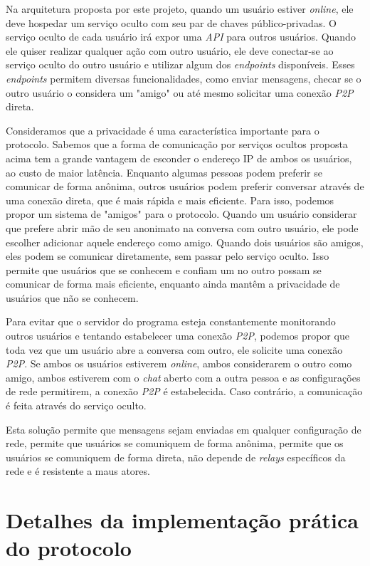 Na arquitetura proposta por este projeto, quando um usuário estiver \textit{online}, ele deve hospedar um serviço oculto com seu par de chaves público-privadas. O serviço oculto de cada usuário irá expor uma \textit{API} para outros usuários. Quando ele quiser realizar qualquer ação com outro usuário, ele deve conectar-se ao serviço oculto do outro usuário e utilizar algum dos \textit{endpoints} disponíveis. Esses \textit{endpoints} permitem diversas funcionalidades, como enviar mensagens, checar se o outro usuário o considera um "amigo" ou até mesmo solicitar uma conexão \textit{P2P} direta.

Consideramos que a privacidade é uma característica importante para o protocolo. Sabemos que a forma de comunicação por serviços ocultos proposta acima tem a grande vantagem de esconder o endereço IP de ambos os usuários, ao custo de maior latência. Enquanto algumas pessoas podem preferir se comunicar de forma anônima, outros usuários podem preferir conversar através de uma conexão direta, que é mais rápida e mais eficiente. Para isso, podemos propor um sistema de "amigos" para o protocolo. Quando um usuário considerar que prefere abrir mão de seu anonimato na conversa com outro usuário, ele pode escolher adicionar aquele endereço como amigo. Quando dois usuários são amigos, eles podem se comunicar diretamente, sem passar pelo serviço oculto. Isso permite que usuários que se conhecem e confiam um no outro possam se comunicar de forma mais eficiente, enquanto ainda mantêm a privacidade de usuários que não se conhecem.

Para evitar que o servidor do programa esteja constantemente monitorando outros usuários e tentando estabelecer uma conexão \textit{P2P}, podemos propor que toda vez que um usuário abre a conversa com outro, ele solicite uma conexão \textit{P2P}. Se ambos os usuários estiverem \textit{online}, ambos considerarem o outro como amigo, ambos estiverem com o \textit{chat} aberto com a outra pessoa e as configurações de rede permitirem, a conexão \textit{P2P} é estabelecida. Caso contrário, a comunicação é feita através do serviço oculto.

Esta solução permite que mensagens sejam enviadas em qualquer configuração de rede, permite que usuários se comuniquem de forma anônima, permite que os usuários se comuniquem de forma direta, não depende de \textit{relays} específicos da rede e é resistente a maus atores.

\section{Detalhes da implementação prática do protocolo}

